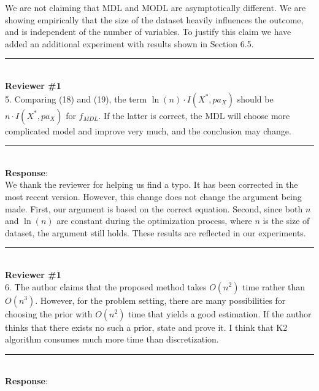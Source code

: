 \documentclass{article}
\begin{document}
We are not claiming that MDL and MODL are asymptotically different.
We are showing empirically that the size of the dataset heavily influences the outcome, and is independent of the number of variables.
To justify this claim we have added an additional experiment with results shown in Section 6.5.

\noindent\rule{8cm}{0.4pt}\\
{\bf Reviewer \#1} \\

5. Comparing (18) and (19), the term  $\ln(n)\cdot I(X^*,pa_X)$ should be $n\cdot I(X^*,pa_X)$ for $f_{MDL}$.  If the latter is correct, the MDL will choose more complicated model and improve very much, and the conclusion may change.

\noindent\rule{8cm}{0.4pt}\\
{\bf Response}:\\

We thank the reviewer for helping us find a typo.
It has been corrected in the most recent version.
However, this change does not change the argument being made.
First, our argument is based on the correct equation.
Second, since both $n$ and $\ln(n)$ are constant during the optimization process, where $n$ is the size of dataset, the argument still holds.
These results are reflected in our experiments.

\noindent\rule{8cm}{0.4pt}\\
{\bf Reviewer \#1} \\

6. The author claims that the proposed method takes $O(n^2)$ time rather than $O(n^3)$. However, for the problem setting, there are many possibilities for choosing the prior with $O(n^2)$ time that yields a good estimation. If the author thinks that there exists no such a prior, state and prove it.  I think that K2 algorithm consumes much more time than discretization.

\noindent\rule{8cm}{0.4pt}\\
{\bf Response}:\\


\end{document}
